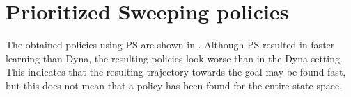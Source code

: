 \newpage
\section{Prioritized Sweeping policies}
The obtained policies using \ac{PS} are shown in . Although \ac{PS} resulted in faster learning than Dyna, the resulting policies look worse than in the Dyna setting. This indicates that the resulting trajectory towards the goal may be found fast, but this does not mean that a policy has been found for the entire state-space.

\begin{figure}[htbp]
\centering
{}
 \\
\end{figure}
